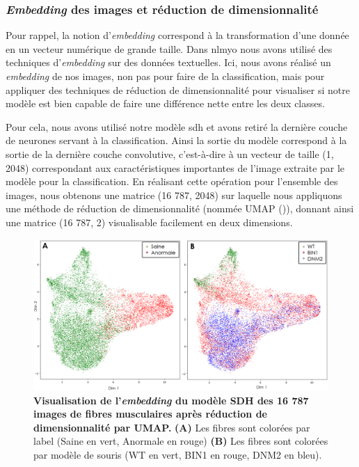 \subsubsection{\textit{Embedding} des images et réduction de dimensionnalité} 
Pour rappel, la notion d'\textit{embedding} correspond  à la transformation d'une donnée en un vecteur numérique de grande taille. Dans \gls{nlmyo} nous avons utilisé des techniques d'\textit{embedding} sur des données textuelles. Ici, nous avons réalisé un \textit{embedding} de nos images, non pas pour faire de la classification, mais pour appliquer des techniques de réduction de dimensionnalité pour visualiser si notre modèle est bien capable de faire une différence nette entre les deux classes.

Pour cela, nous avons utilisé notre modèle \gls{sdh} et avons retiré la dernière couche de neurones servant à la classification. Ainsi la sortie du modèle correspond à la sortie de la dernière couche convolutive, c'est-à-dire à un vecteur de taille (1, 2048) correspondant aux caractéristiques importantes de l'image extraite par le modèle pour la classification.  En réalisant cette opération pour l'ensemble des images, nous obtenons une matrice (16 787, 2048) sur laquelle nous appliquons une méthode de réduction de dimensionnalité (nommée UMAP (\cite{mcinnes_umap_2020})), donnant ainsi une matrice (16 787, 2) visualisable facilement en deux dimensions.
\begin{figure}[!ht]
 \centering
 \includegraphics[width=1\textwidth]{figures/umap_sdh.png}
 \caption[Visualisation de l'\textit{embedding} du modèle SDH]{\textbf{Visualisation de l'\textit{embedding} du modèle SDH des 16 787 images de fibres musculaires après réduction de dimensionnalité par UMAP. }\textbf{(A)} Les fibres sont colorées par label (Saine en vert, Anormale en rouge) \textbf{(B)} Les fibres sont colorées par modèle de souris (WT en vert, BIN1 en rouge, DNM2 en bleu).}
 \label{fig:umap_sdh}
\end{figure}

